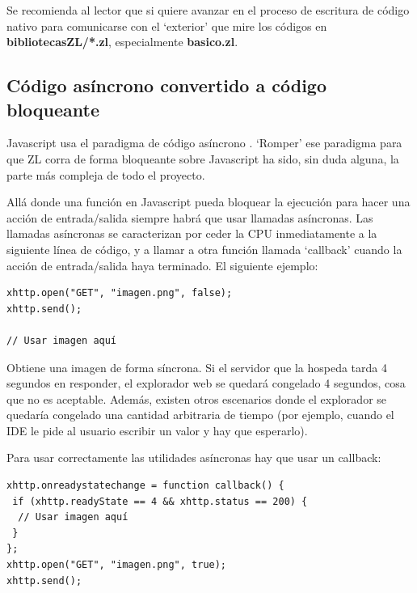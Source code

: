 \documentclass{report}
\begin{document}
	\vspace{10px}
	
	
	
	\vspace{10px}
	
	Se recomienda al lector que si quiere avanzar en el proceso de escritura de código nativo para comunicarse con el `exterior' que mire los códigos en \textbf{bibliotecasZL/*.zl}, especialmente \textbf{basico.zl}.
	
	\subsection{Código asíncrono convertido a código bloqueante}
	
	Javascript usa el paradigma de código asíncrono \cite{javascriptasync}. `Romper' ese paradigma para que ZL corra de forma bloqueante sobre Javascript ha sido, sin duda alguna, la parte más compleja de todo el proyecto. 
	
	\vspace{10px}

	Allá donde una función en Javascript pueda bloquear la ejecución para hacer una acción de entrada/salida siempre habrá que usar llamadas asíncronas. Las llamadas asíncronas se caracterizan por ceder la CPU inmediatamente a la siguiente línea de código, y a llamar a otra función llamada `callback' cuando la acción de entrada/salida haya terminado. El siguiente ejemplo:
	
\begin{BVerbatim}
xhttp.open("GET", "imagen.png", false);
xhttp.send();

// Usar imagen aquí

\end{BVerbatim}

	Obtiene una imagen de forma síncrona. Si el servidor que la hospeda tarda 4 segundos en responder, el explorador web se quedará congelado 4 segundos, cosa que no es aceptable. Además, existen otros escenarios donde el explorador se quedaría congelado una cantidad arbitraria de tiempo (por ejemplo, cuando el IDE le pide al usuario escribir un valor y hay que esperarlo).
	
	Para usar correctamente las utilidades asíncronas hay que usar un callback:


\begin{BVerbatim}
xhttp.onreadystatechange = function callback() {
 if (xhttp.readyState == 4 && xhttp.status == 200) {
  // Usar imagen aquí
 }
};
xhttp.open("GET", "imagen.png", true);
xhttp.send();
\end{BVerbatim}
\end{document}
